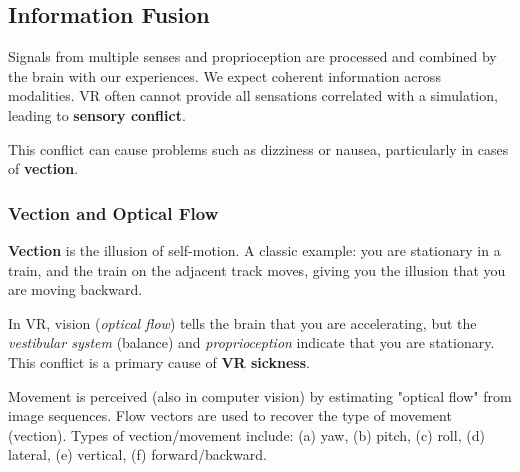 \documentclass[11pt,a4paper]{article}
\theoremstyle{definition}
\theoremstyle{plain}
\theoremstyle{remark}
\begin{document}
\subsection{Information Fusion}

\begin{tcolorbox}[colback=blue!5!white,colframe=blue!75!black,title=\textbf{Multisensory Integration and Sensory Conflict}]
Signals from multiple senses and proprioception are processed and combined by the brain with our experiences. We expect coherent information across modalities. VR often cannot provide all sensations correlated with a simulation, leading to \textbf{sensory conflict}.

This conflict can cause problems such as dizziness or nausea, particularly in cases of \textbf{vection}.
\end{tcolorbox}

\subsubsection{Vection and Optical Flow}

\begin{tcolorbox}[colback=green!5!white,colframe=green!75!black,title=\textbf{Vection: The Illusion of Self-Motion}]
\textbf{Vection} is the illusion of self-motion. A classic example: you are stationary in a train, and the train on the adjacent track moves, giving you the illusion that you are moving backward.

In VR, vision (\textit{optical flow}) tells the brain that you are accelerating, but the \textit{vestibular system} (balance) and \textit{proprioception} indicate that you are stationary. This conflict is a primary cause of \textbf{VR sickness}.

Movement is perceived (also in computer vision) by estimating "optical flow" from image sequences. Flow vectors are used to recover the type of movement (vection). Types of vection/movement include: (a) yaw, (b) pitch, (c) roll, (d) lateral, (e) vertical, (f) forward/backward.
\end{tcolorbox}
\end{document}
